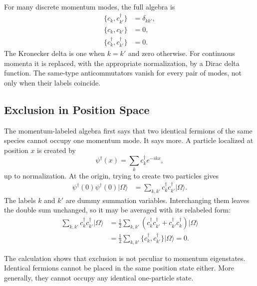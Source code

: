 For many discrete momentum modes, the full algebra is
\begin{align}
\{c_k,c_{k'}^\dagger\}&=\delta_{kk'},
\\
\{c_k,c_{k'}\}&=0,
\\
\{c_k^\dagger,c_{k'}^\dagger\}&=0.
\end{align}
The Kronecker delta is one when \(k=k'\) and zero otherwise. For continuous momenta it is replaced, with the appropriate normalization, by a Dirac delta function. The same-type anticommutators vanish for every pair of modes, not only when their labels coincide.

\subsection{Exclusion in Position Space}

The momentum-labeled algebra first says that two identical fermions of the same species cannot occupy one momentum mode. It says more. A particle localized at position \(x\) is created by
\begin{equation}
\psi^\dagger(x)=\sum_k c_k^\dagger e^{-ikx},
\end{equation}
up to normalization. At the origin, trying to create two particles gives
\begin{align}
\psi^\dagger(0)\psi^\dagger(0)|\Omega\rangle
&=\sum_{k,k'}c_k^\dagger c_{k'}^\dagger|\Omega\rangle.
\end{align}
The labels \(k\) and \(k'\) are dummy summation variables. Interchanging them leaves the double sum unchanged, so it may be averaged with its relabeled form:
\begin{align}
\sum_{k,k'}c_k^\dagger c_{k'}^\dagger|\Omega\rangle
&=\frac12\sum_{k,k'}
\left(c_k^\dagger c_{k'}^\dagger
+c_{k'}^\dagger c_k^\dagger\right)|\Omega\rangle
\\
&=\frac12\sum_{k,k'}
\{c_k^\dagger,c_{k'}^\dagger\}|\Omega\rangle
=0.
\end{align}

\begin{classroomqa}
\end{classroomqa}

The calculation shows that exclusion is not peculiar to momentum eigenstates. Identical fermions cannot be placed in the same position state either. More generally, they cannot occupy any identical one-particle state.


